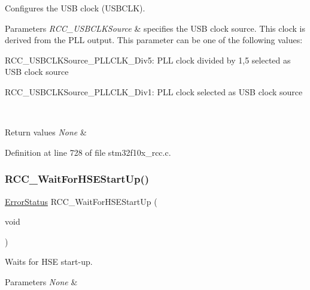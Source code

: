 Configures the U\+SB clock (U\+S\+B\+C\+LK). 


\begin{DoxyParams}{Parameters}
{\em R\+C\+C\+\_\+\+U\+S\+B\+C\+L\+K\+Source} & specifies the U\+SB clock source. This clock is derived from the P\+LL output. This parameter can be one of the following values\+: \begin{DoxyItemize}
\item R\+C\+C\+\_\+\+U\+S\+B\+C\+L\+K\+Source\+\_\+\+P\+L\+L\+C\+L\+K\+\_\+Div5\+: P\+LL clock divided by 1,5 selected as U\+SB clock source \item R\+C\+C\+\_\+\+U\+S\+B\+C\+L\+K\+Source\+\_\+\+P\+L\+L\+C\+L\+K\+\_\+\+Div1\+: P\+LL clock selected as U\+SB clock source \end{DoxyItemize}
\\
\hline
\end{DoxyParams}

\begin{DoxyRetVals}{Return values}
{\em None} & \\
\hline
\end{DoxyRetVals}


Definition at line 728 of file stm32f10x\+\_\+rcc.\+c.

\mbox{\label{group___r_c_c___exported___functions_gae0f15692614dd048ee4110a056f001dc}} 
\subsubsection{\texorpdfstring{R\+C\+C\+\_\+\+Wait\+For\+H\+S\+E\+Start\+Up()}{RCC\_WaitForHSEStartUp()}}
{\footnotesize\ttfamily \hyperlink{group___exported__types_ga8333b96c67f83cba354b3407fcbb6ee8}{Error\+Status} R\+C\+C\+\_\+\+Wait\+For\+H\+S\+E\+Start\+Up (\begin{DoxyParamCaption}\item[{void}]{ }\end{DoxyParamCaption})}



Waits for H\+SE start-\/up. 


\begin{DoxyParams}{Parameters}
{\em None} & \\
\hline
\end{DoxyParams}

